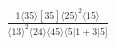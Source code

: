 \documentclass[varwidth, border=5pt]{standalone}
\begin{document}
\begin{my}
$\begin{gathered}
\scriptscriptstyle\frac{1⟨35⟩[35]⟨25⟩^2⟨15⟩}{⟨13⟩^2⟨24⟩⟨45⟩⟨5|1+3|5]}
\end{gathered}$
\end{my}
\end{document}
